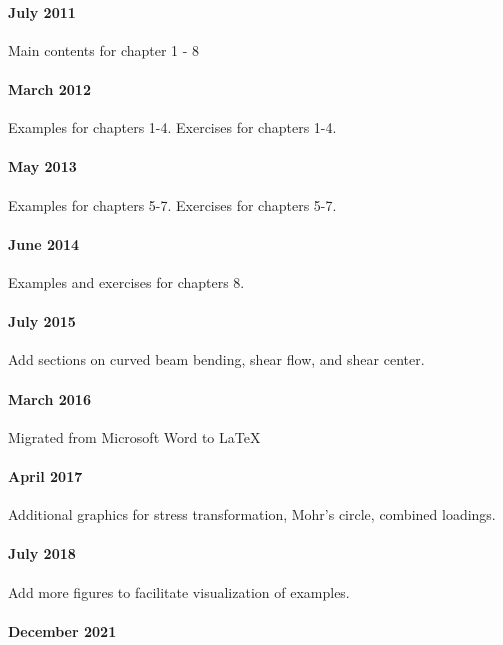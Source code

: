 \documentclass[
fontsize=10pt,
a4paper,
twosides=false,
open=any,
svgnames,
]{kaobook} %
\begin{document}
\paragraph{July 2011}

Main contents for chapter 1 - 8

\paragraph{March 2012}

Examples for chapters 1-4. Exercises for chapters 1-4.

\paragraph{May 2013}

Examples for chapters 5-7. Exercises for chapters 5-7.

\paragraph{June 2014}

Examples and exercises for chapters 8.

\paragraph{July 2015}

Add sections on curved beam bending, shear flow, and shear center.

\paragraph{March 2016}

Migrated from Microsoft Word to \LaTeX\

\paragraph{April 2017}

Additional graphics for stress transformation, Mohr's circle, combined loadings.

\paragraph{July 2018}

Add more figures to facilitate visualization of examples.

\paragraph{December 2021}
\end{document}

